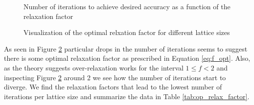 \documentclass{article}
\begin{document}
\begin{figure}[H]
  \begin{center}
  \end{center}
  \caption{Number of iterations to achieve desired accuracy as a function of the relaxation factor}
  \label{fig:iter_plot}
\end{figure}


\begin{figure}[H]
  \begin{center}
  \end{center}
  \caption{Visualization of the optimal relxation factor for different lattice sizes}
  \label{fig:optimal_plot}
\end{figure}

As seen in Figure \ref{fig:optimal_plot} particular drops in the number of iterations seems to suggest there is some optimal relaxation factor as prescribed in
Equation \ref{eq:f_opt}. Also, as the theory suggests over-relaxation works for the interval $1 \leq f < 2$ and inspecting Figure \ref{fig:optimal_plot} around 2
we see how the number of iterations start to diverge. We find the relaxation factors that lead to the lowest number of iterations per lattice size and summarize
the data in Table \ref{tab:op_relax_factor}.
\end{document}
